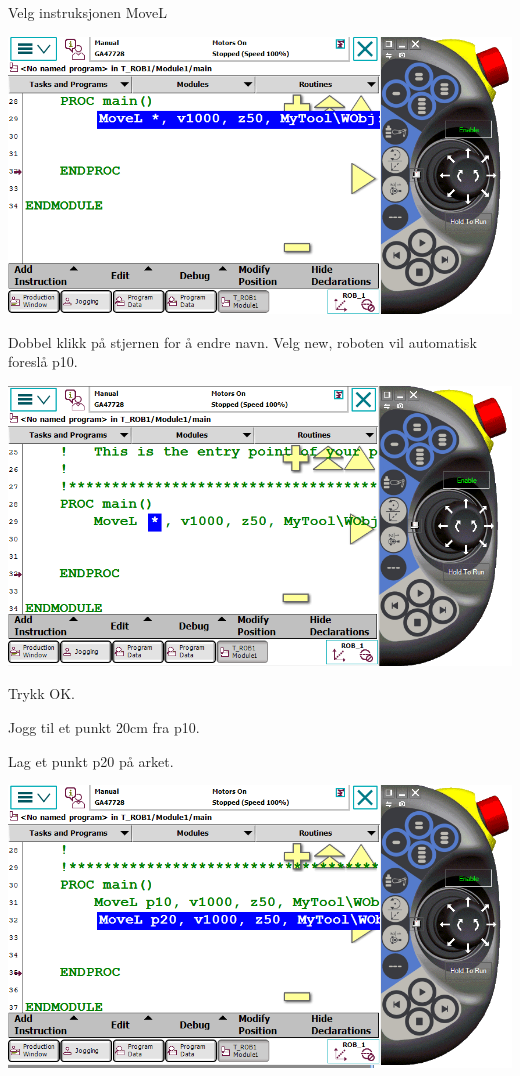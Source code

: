 Velg instruksjonen MoveL

\includegraphics[width=1\textwidth]{i04861x23}

Dobbel klikk på stjernen for å endre navn. Velg new, roboten vil automatisk
foreslå p10.

\includegraphics[width=1\textwidth]{i04861x24}

Trykk OK.

Jogg til et punkt 20cm fra p10.

Lag et punkt p20 på arket.

\includegraphics[width=1\textwidth]{i04861x25}

